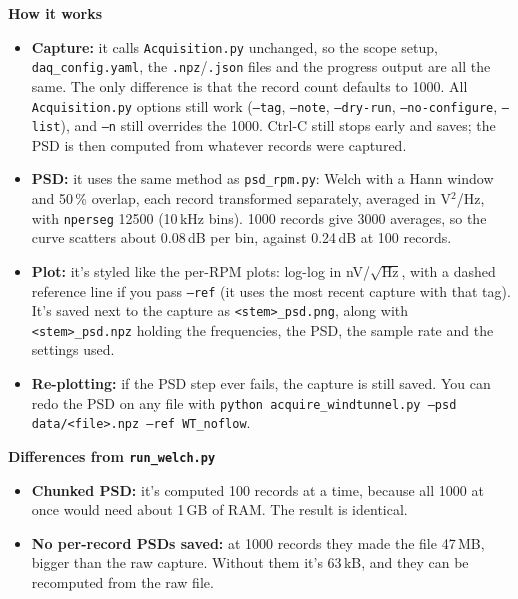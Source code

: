 \begin{tcolorbox}[breakable, colback=gray!4, colframe=gray!50,
 	boxrule=0.4pt, arc=2pt, fontupper=\small,
 	left=6pt, right=6pt, top=4pt, bottom=4pt]
 	\textbf{How it works}
 	\begin{itemize}
 		\item \textbf{Capture:} it calls \texttt{Acquisition.py} unchanged, so the scope setup, \texttt{daq\_config.yaml}, the \texttt{.npz}/\texttt{.json} files and the progress output are all the same. The only difference is that the record count defaults to 1000. All \texttt{Acquisition.py} options still work (\texttt{--tag}, \texttt{--note}, \texttt{--dry-run}, \texttt{--no-configure}, \texttt{--list}), and \texttt{--n} still overrides the 1000. Ctrl-C still stops early and saves; the PSD is then computed from whatever records were captured.
 		\item \textbf{PSD:} it uses the same method as \texttt{psd\_rpm.py}: Welch with a Hann window and 50\,\% overlap, each record transformed separately, averaged in V$^2$/Hz, with \texttt{nperseg} 12500 (10\,kHz bins). 1000 records give 3000 averages, so the curve scatters about 0.08\,dB per bin, against 0.24\,dB at 100 records.
 		\item \textbf{Plot:} it's styled like the per-RPM plots: log-log in nV/$\sqrt{\mathrm{Hz}}$, with a dashed reference line if you pass \texttt{--ref} (it uses the most recent capture with that tag). It's saved next to the capture as \texttt{<stem>\_psd.png}, along with \texttt{<stem>\_psd.npz} holding the frequencies, the PSD, the sample rate and the settings used.
 		\item \textbf{Re-plotting:} if the PSD step ever fails, the capture is still saved. You can redo the PSD on any file with \texttt{python acquire\_windtunnel.py --psd data/<file>.npz --ref WT\_noflow}.
 	\end{itemize}
 	
 	\textbf{Differences from \texttt{run\_welch.py}}
 	\begin{itemize}
 		\item \textbf{Chunked PSD:} it's computed 100 records at a time, because all 1000 at once would need about 1\,GB of RAM. The result is identical.
 		\item \textbf{No per-record PSDs saved:} at 1000 records they made the file 47\,MB, bigger than the raw capture. Without them it's 63\,kB, and they can be recomputed from the raw file.
 	\end{itemize}
 	

\end{tcolorbox}

